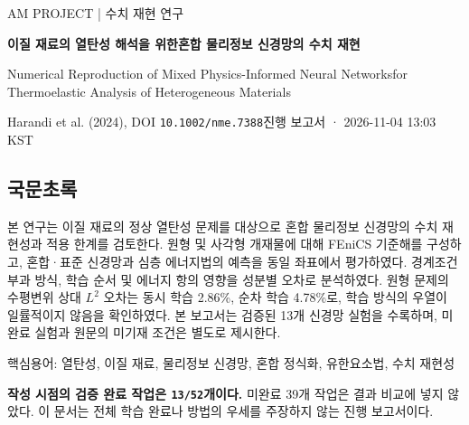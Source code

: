 \documentclass[10pt,a4paper]{article}
\begin{document}
AM PROJECT  |  수치 재현 연구\par

{\LARGE\bfseries\sffamily\color{ink} 이질 재료의 열탄성 해석을 위한\newline 혼합 물리정보 신경망의 수치 재현\par}\vspace{5mm}

{\small\color{muted} Numerical Reproduction of Mixed Physics-Informed Neural Networks\newline for Thermoelastic Analysis of Heterogeneous Materials\par}

{\small\color{muted} Harandi et al. (2024), DOI \nolinkurl{10.1002/nme.7388}\newline 진행 보고서 · 2026-11-04 13:03 KST\par}

\subsection{국문초록}

본 연구는 이질 재료의 정상 열탄성 문제를 대상으로 혼합 물리정보 신경망의 수치 재현성과 적용 한계를 검토한다. 원형 및 사각형 개재물에 대해 FEniCS 기준해를 구성하고, 혼합·표준 신경망과 심층 에너지법의 예측을 동일 좌표에서 평가하였다. 경계조건 부과 방식, 학습 순서 및 에너지 항의 영향을 성분별 오차로 분석하였다. 원형 문제의 수평변위 상대 $L^2$ 오차는 동시 학습 2.86\%, 순차 학습 4.78\%로, 학습 방식의 우열이 일률적이지 않음을 확인하였다. 본 보고서는 검증된 13개 신경망 실험을 수록하며, 미완료 실험과 원문의 미기재 조건은 별도로 제시한다.\par

{\small\color{muted} 핵심용어: 열탄성, 이질 재료, 물리정보 신경망, 혼합 정식화, 유한요소법, 수치 재현성\par}

\textbf{작성 시점의 검증 완료 작업은 \nolinkurl{13/52}개이다.} 미완료 39개 작업은 결과 비교에 넣지 않았다. 이 문서는 전체 학습 완료나 방법의 우세를 주장하지 않는 진행 보고서이다.\par

\begingroup\small
\end{document}
